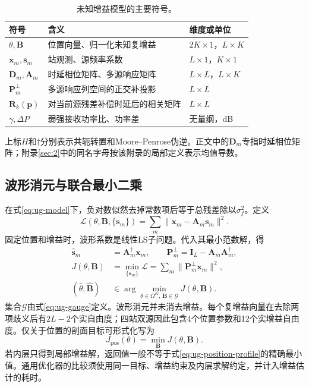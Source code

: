 \begin{table}[!htbp]
\centering\caption{未知增益模型的主要符号。}\label{tab:ug-symbols}
\small\renewcommand{\arraystretch}{1.15}
\begin{tabularx}{\linewidth}{Y{.8}Y{1.5}Y{.7}}
\toprule 符号 & 含义 & 维度或单位\\\midrule
$\theta,\mathbf B$ & 位置向量、归一化未知复增益 & $2K\times1$，$L\times K$\\
$\mathbf x_m,\mathbf s_m$ & 站观测、源频率系数 & $L\times1$，$K\times1$\\
$\mathbf D_m,\mathbf A_m$ & 时延相位矩阵、多源响应矩阵 & $L\times L$，$L\times K$\\
$\mathbf P_m^\perp$ & 多源响应列空间的正交补投影 & $L\times L$\\
$\mathbf R_k(\mathbf p)$ & 对当前源残差补偿时延后的相关矩阵 & $L\times L$\\
$\gamma,\Delta P$ & 弱强接收功率比、功率差 & 无量纲，dB\\
\bottomrule\end{tabularx}
\end{table}
上标$H$和$\dagger$分别表示共轭转置和Moore--Penrose伪逆。正文中的$\mathbf D_m$专指时延相位矩阵；附录\ref{sec:2}中的同名字母按该附录的局部定义表示均值导数。

\subsection{波形消元与联合最小二乘}\label{sec:ug-ls}
在式\eqref{eq:ug-model}下，负对数似然去掉常数项后等于总残差除以$\sigma_f^2$。定义
\begin{equation}\label{eq:ug-full-ls}
\mathcal L(\theta,\mathbf B,\{\mathbf s_m\})
=\sum_m\|\mathbf x_m-\mathbf A_m\mathbf s_m\|^2.
\end{equation}
固定位置和增益时，波形系数是线性LS子问题。代入其最小范数解，得
\begin{equation}\label{eq:ug-profile}
\begin{aligned}
\widehat{\mathbf s}_m&=\mathbf A_m^\dagger\mathbf x_m,\qquad
\mathbf P_m^\perp=\mathbf I_L-\mathbf A_m\mathbf A_m^\dagger,\\
J(\theta,\mathbf B)&=\min_{\{\mathbf s_m\}}\mathcal L
=\sum_m\|\mathbf P_m^\perp\mathbf x_m\|^2,\\
(\widehat\theta,\widehat{\mathbf B})&\in
\arg\min_{\theta\in\Omega^K,\,\mathbf B\in\mathcal G}
J(\theta,\mathbf B).
\end{aligned}
\end{equation}
集合$\mathcal G$由式\eqref{eq:ug-gauge}定义。波形消元并未消去增益。每个复增益向量在去除两项歧义后有$2L-2$个实自由度；四站双源因此包含4个位置参数和12个实增益自由度。仅关于位置的剖面目标可形式化写为
\begin{equation}\label{eq:ug-position-profile}
J_{\mathrm{pos}}(\theta)=\min_{\mathbf B}J(\theta,\mathbf B).
\end{equation}
若内层只得到局部增益解，返回值一般不等于式\eqref{eq:ug-position-profile}的精确最小值。通用优化器的比较须使用同一目标、增益约束及内层求解约定，并计入增益估计的耗时。


